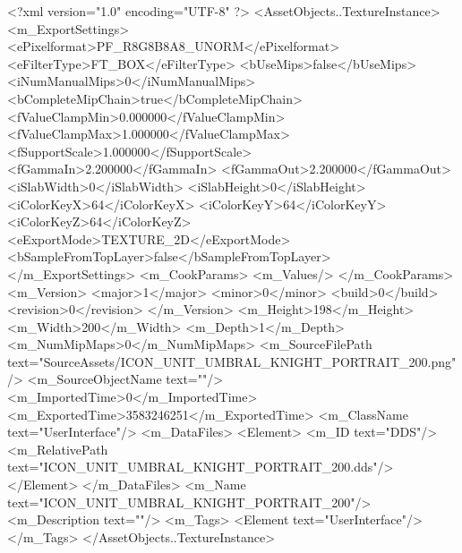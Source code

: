 <?xml version="1.0" encoding="UTF-8" ?>
<AssetObjects..TextureInstance>
	<m_ExportSettings>
		<ePixelformat>PF_R8G8B8A8_UNORM</ePixelformat>
		<eFilterType>FT_BOX</eFilterType>
		<bUseMips>false</bUseMips>
		<iNumManualMips>0</iNumManualMips>
		<bCompleteMipChain>true</bCompleteMipChain>
		<fValueClampMin>0.000000</fValueClampMin>
		<fValueClampMax>1.000000</fValueClampMax>
		<fSupportScale>1.000000</fSupportScale>
		<fGammaIn>2.200000</fGammaIn>
		<fGammaOut>2.200000</fGammaOut>
		<iSlabWidth>0</iSlabWidth>
		<iSlabHeight>0</iSlabHeight>
		<iColorKeyX>64</iColorKeyX>
		<iColorKeyY>64</iColorKeyY>
		<iColorKeyZ>64</iColorKeyZ>
		<eExportMode>TEXTURE_2D</eExportMode>
		<bSampleFromTopLayer>false</bSampleFromTopLayer>
	</m_ExportSettings>
	<m_CookParams>
		<m_Values/>
	</m_CookParams>
	<m_Version>
		<major>1</major>
		<minor>0</minor>
		<build>0</build>
		<revision>0</revision>
	</m_Version>
	<m_Height>198</m_Height>
	<m_Width>200</m_Width>
	<m_Depth>1</m_Depth>
	<m_NumMipMaps>0</m_NumMipMaps>
	<m_SourceFilePath text="SourceAssets/ICON_UNIT_UMBRAL_KNIGHT_PORTRAIT_200.png"/>
	<m_SourceObjectName text=""/>
	<m_ImportedTime>0</m_ImportedTime>
	<m_ExportedTime>3583246251</m_ExportedTime>
	<m_ClassName text="UserInterface"/>
	<m_DataFiles>
		<Element>
			<m_ID text="DDS"/>
			<m_RelativePath text="ICON_UNIT_UMBRAL_KNIGHT_PORTRAIT_200.dds"/>
		</Element>
	</m_DataFiles>
	<m_Name text="ICON_UNIT_UMBRAL_KNIGHT_PORTRAIT_200"/>
	<m_Description text=""/>
	<m_Tags>
		<Element text="UserInterface"/>
	</m_Tags>
</AssetObjects..TextureInstance>

